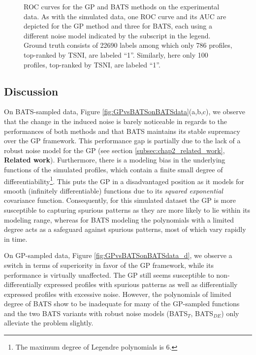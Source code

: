       \begin{figure}[!htbp]
	\centering
	\caption[GP vs. BATS on experimental data.] {
	  ROC curves for the GP and BATS methods on the experimental data.
	  As with the simulated data, one ROC curve and its AUC are depicted for the GP method and three
	  for BATS, each using a different noise model indicated by the subscript in
	  the legend. \textbf{} Ground truth consists
	  of 22690 labels among which only 786 profiles, top-ranked by
	  TSNI, are labeled ``1''. \textbf{} Similarly, here only
	  100 profiles, top-ranked by TSNI, are labeled ``1''.}
	\label{fig:GPvsBATSonDGdata}
      \end{figure}


    \subsection{Discussion}
      On BATS-sampled data, Figure \ref{fig:GPvsBATSonBATSdata}(a,b,c), we observe
      that the change in the induced noise is barely noticeable in regards to the
      performances of both methods and that BATS maintains its stable supremacy over
      the GP framework. This performance gap is partially due to the lack of a
      robust  noise model for the GP (see section \ref{subsec:chap2_related_work}, \textbf{Related work}).
      Furthermore, there is a modeling bias in the underlying functions of the
      simulated profiles, which contain a finite small degree of differentiability\footnote{
      The maximum degree of Legendre polynomials is 6.}. This puts the GP in a
      disadvantaged position as it models for smooth (infinitely differentiable)
      functions due to its \textit{squared exponential} covariance function.
      Consequently, for this simulated dataset the GP is more susceptible to
      capturing spurious patterns as they are more likely to lie within its
      modeling range, whereas for BATS modeling the polynomials with a limited
      degree acts as a safeguard against spurious patterns, most of which vary
      rapidly in time.

      On GP-sampled data, Figure \ref{fig:GPvsBATSonBATSdata_d}, we observe a switch in terms of superiority in favor of the GP framework, while its performance is virtually unaffected.
      The GP still seems susceptible to non-differentially expressed profiles with spurious patterns as well as differentially expressed profiles with excessive noise.
      However, the polynomials of limited degree of BATS show to be inadequate for many of the GP-sampled functions and the two BATS variants with robust noise models (BATS$_T$, BATS$_{DE}$) only alleviate the problem slightly.

